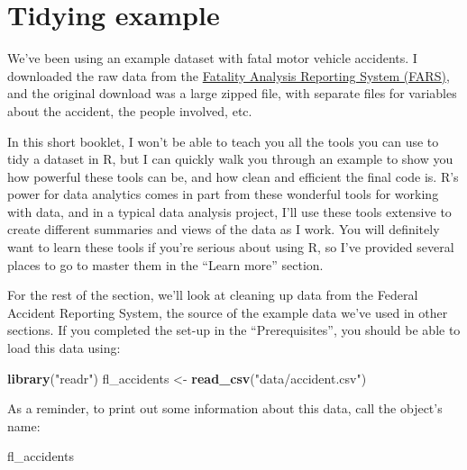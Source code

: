 \documentclass[]{tufte-book}
\newenvironment{Shaded}{}{}
\newcommand{\KeywordTok}[1]{\textcolor[rgb]{0.00,0.44,0.13}{\textbf{#1}}}
\newcommand{\NormalTok}[1]{#1}
\newcommand{\StringTok}[1]{\textcolor[rgb]{0.25,0.44,0.63}{#1}}
\begin{document}
\hypertarget{tidying-example}{%
\section{Tidying example}\label{tidying-example}}

We've been using an example dataset with fatal motor vehicle accidents. I downloaded the raw
data from the \href{https://www.nhtsa.gov/research-data/fatality-analysis-reporting-system-fars}{Fatality Analysis Reporting System (FARS)}, and the
original download was a large zipped file, with separate files for variables about the
accident, the people involved, etc.

In this short booklet, I won't be able to teach you all the tools you can use to tidy
a dataset in R, but I can quickly walk you through an example to show you how powerful these
tools can be, and how clean and efficient the final code is. R's power for data analytics
comes in part from these wonderful tools for working with data, and in a typical data analysis
project, I'll use these tools extensive to create different summaries and views of the data
as I work. You will definitely want to learn these tools if you're serious about using R,
so I've provided several places to go to master them in the ``Learn more'' section.

For the rest of the section, we'll look at cleaning up data from the Federal Accident
Reporting System, the source of the example data we've used in other sections.
If you completed the set-up in the ``Prerequisites'', you should be able to load this
data using:

\begin{Shaded}
\begin{Highlighting}[]
\KeywordTok{library}\NormalTok{(}\StringTok{"readr"}\NormalTok{)}
\NormalTok{fl_accidents <-}\StringTok{ }\KeywordTok{read_csv}\NormalTok{(}\StringTok{"data/accident.csv"}\NormalTok{)}
\end{Highlighting}
\end{Shaded}

As a reminder, to print out some information about this data, call the object's name:

\begin{Shaded}
\begin{Highlighting}[]
\NormalTok{fl_accidents}
\end{Highlighting}
\end{Shaded}
\end{document}

